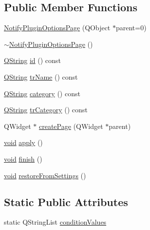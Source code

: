 \subsection*{Public Member Functions}
\begin{DoxyCompactItemize}
\item 
\hyperlink{group__notify_gaf584594e769010fbcdb1feb54b94eaab}{Notify\-Plugin\-Options\-Page} (Q\-Object $\ast$parent=0)
\item 
\hyperlink{group__notify_ga3dfd084ec6b7b9f55aeb3a5c475b11d7}{$\sim$\-Notify\-Plugin\-Options\-Page} ()
\item 
\hyperlink{group___u_a_v_objects_plugin_gab9d252f49c333c94a72f97ce3105a32d}{Q\-String} \hyperlink{group__notify_ga9528eeaab32e5a6696eb4e82c7dda847}{id} () const 
\item 
\hyperlink{group___u_a_v_objects_plugin_gab9d252f49c333c94a72f97ce3105a32d}{Q\-String} \hyperlink{group__notify_ga156b37b99e34d9b0e865f57efaa55f3c}{tr\-Name} () const 
\item 
\hyperlink{group___u_a_v_objects_plugin_gab9d252f49c333c94a72f97ce3105a32d}{Q\-String} \hyperlink{group__notify_ga1a0c17416e10df677d14565330619cfb}{category} () const 
\item 
\hyperlink{group___u_a_v_objects_plugin_gab9d252f49c333c94a72f97ce3105a32d}{Q\-String} \hyperlink{group__notify_ga963ad76e88d1a3737bd5d12e493c214a}{tr\-Category} () const 
\item 
Q\-Widget $\ast$ \hyperlink{group__notify_gaab5b02bf851c75f0476a29cc59bde9ae}{create\-Page} (Q\-Widget $\ast$parent)
\item 
\hyperlink{group___u_a_v_objects_plugin_ga444cf2ff3f0ecbe028adce838d373f5c}{void} \hyperlink{group__notify_gae0ac041ae8505afd88f981a6ac235fe7}{apply} ()
\item 
\hyperlink{group___u_a_v_objects_plugin_ga444cf2ff3f0ecbe028adce838d373f5c}{void} \hyperlink{group__notify_gaa13ff08a62eca11b672d5f7d88fa7c40}{finish} ()
\item 
\hyperlink{group___u_a_v_objects_plugin_ga444cf2ff3f0ecbe028adce838d373f5c}{void} \hyperlink{group__notify_ga2607c7c5d3db72401fe48f07838d36ce}{restore\-From\-Settings} ()
\end{DoxyCompactItemize}
\subsection*{Static Public Attributes}
\begin{DoxyCompactItemize}
\item 
static Q\-String\-List \hyperlink{group__notify_ga9823971d5ab6a1e6f68073d8553a7414}{condition\-Values}
\end{DoxyCompactItemize}


